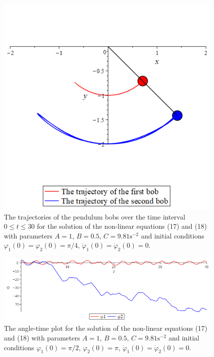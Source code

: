 \documentclass[11pt]{article}
\begin{document}
\begin{figure}[H]
    \centering
    \includegraphics[scale=0.5]{Figure3.PNG}
    \caption{The trajectories of the pendulum bobs over the time interval \(0\le t\le 30\) for the solution of the non-linear equations (17) and (18) with parameters \(A = 1\), \(B= 0.5\), \(C = 9.81 \mathrm{s}^{-2}\) and initial conditions \(\varphi_1(0) = \varphi_2(0) = \pi/4\), \(\dot{\varphi}_1(0) = \dot{\varphi}_2(0) = 0\).}
    \label{Figure 3}
\end{figure}
\begin{figure}[ht]
    \centering
    \includegraphics[scale=0.5]{Figure4.PNG}
    \caption{The angle-time plot for the solution of the non-linear equations (17) and (18) with parameters \(A = 1\), \(B= 0.5\), \(C = 9.81 \mathrm{s}^{-2}\) and initial conditions \(\varphi_1(0) = \pi/2\), \(\varphi_2(0)= \pi\), \(\dot{\varphi}_1(0) = \dot{\varphi}_2(0) = 0\).}
    \label{Figure 4}
\end{figure}
\end{document}
